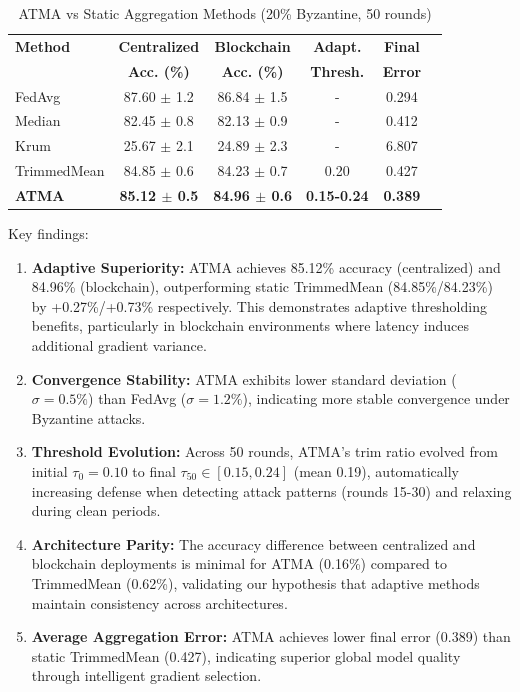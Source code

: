 \documentclass{ieeeaccess}
\begin{document}
\begin{table}[t]
\caption{ATMA vs Static Aggregation Methods (20\% Byzantine, 50 rounds)}
\label{tab:atma_results}
\centering
\begin{tabular}{lccccc}
\toprule
\textbf{Method} & \textbf{Centralized} & \textbf{Blockchain} & \textbf{Adapt.} & \textbf{Final} \\
& \textbf{Acc. (\%)} & \textbf{Acc. (\%)} & \textbf{Thresh.} & \textbf{Error} \\
\midrule
FedAvg & 87.60 $\pm$ 1.2 & 86.84 $\pm$ 1.5 & - & 0.294 \\
Median & 82.45 $\pm$ 0.8 & 82.13 $\pm$ 0.9 & - & 0.412 \\
Krum & 25.67 $\pm$ 2.1 & 24.89 $\pm$ 2.3 & - & 6.807 \\
TrimmedMean & 84.85 $\pm$ 0.6 & 84.23 $\pm$ 0.7 & 0.20 & 0.427 \\
\textbf{ATMA} & \textbf{85.12 $\pm$ 0.5} & \textbf{84.96 $\pm$ 0.6} & \textbf{0.15-0.24} & \textbf{0.389} \\
\bottomrule
\end{tabular}
\end{table}

Key findings:
\begin{enumerate}
    \item \textbf{Adaptive Superiority:} ATMA achieves 85.12\% accuracy (centralized) and 84.96\% (blockchain), outperforming static TrimmedMean (84.85\%/84.23\%) by +0.27\%/+0.73\% respectively. This demonstrates adaptive thresholding benefits, particularly in blockchain environments where latency induces additional gradient variance.
    
    \item \textbf{Convergence Stability:} ATMA exhibits lower standard deviation ($\sigma=0.5\%$) than FedAvg ($\sigma=1.2\%$), indicating more stable convergence under Byzantine attacks.
    
    \item \textbf{Threshold Evolution:} Across 50 rounds, ATMA's trim ratio evolved from initial $\tau_0=0.10$ to final $\tau_{50} \in [0.15, 0.24]$ (mean 0.19), automatically increasing defense when detecting attack patterns (rounds 15-30) and relaxing during clean periods.
    
    \item \textbf{Architecture Parity:} The accuracy difference between centralized and blockchain deployments is minimal for ATMA (0.16\%) compared to TrimmedMean (0.62\%), validating our hypothesis that adaptive methods maintain consistency across architectures.
    
    \item \textbf{Average Aggregation Error:} ATMA achieves lower final error (0.389) than static TrimmedMean (0.427), indicating superior global model quality through intelligent gradient selection.
\end{enumerate}
\end{document}
